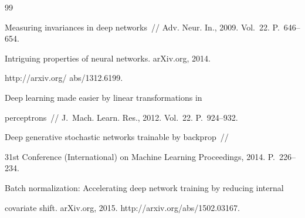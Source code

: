 {{\begin{thebibliography}{99}


Measuring invariances in deep networks~/\!\!/ Adv. Neur. In., 2009. Vol.~22. P.~646--654.











Intriguing properties of neural networks. arXiv.org, 2014. 


{\sf http://arxiv.org/ abs/1312.6199}.














Deep learning made easier by linear transformations in


perceptrons~/\!\!/ J.~Mach. Learn. Res., 2012. Vol.~22. P.~924--932.











Deep generative stochastic networks trainable by backprop~/\!\!/  


31st  Conference (International) on Machine Learning Proceedings, 2014. P.~226--234.











Batch normalization: Accelerating deep network training by reducing internal 


covariate shift. arXiv.org, 2015. {\sf http://arxiv.org/abs/1502.03167}.








\end{thebibliography}}}
